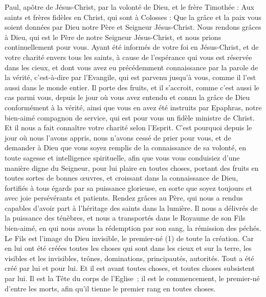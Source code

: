 \BFont
\begin{multicols}{2}
\TextTitle{[Salutation]}
\VerseOne{}Paul, apôtre de Jésus-Christ, par la volonté de Dieu, et le frère Timothée :
Aux saints et frères fidèles en Christ, qui sont à Colosses : Que la grâce et la paix vous soient données par Dieu notre Père et Seigneur Jésus-Christ.
Nous rendons grâces à Dieu, qui est le Père de notre Seigneur Jésus-Christ, et nous prions continuellement pour vous.
Ayant été informés de votre foi en Jésus-Christ, et de votre charité envers tous les saints,
à cause de l'espérance qui vous est réservée dans les cieux, et dont vous avez eu précédemment connaissance par la parole de la vérité, c'est-à-dire par l'Evangile,
qui est parvenu jusqu'à vous, comme il l'est aussi dans le monde entier. Il porte des fruits, et il s’accroit, comme c’est aussi le cas parmi vous, depuis le jour où vous avez entendu et connu la grâce de Dieu conformément à la vérité,
ainsi que vous en avez été instruits par Epaphras, notre bien-aimé compagnon de service, qui est pour vous un fidèle ministre de Christ.
Et il nous a fait connaître votre charité selon l’Esprit.
C'est pourquoi depuis le jour où nous l’avons appris, nous n’avons cessé de prier pour vous, et de demander à Dieu que vous soyez remplis de la connaissance de sa volonté, en toute sagesse et intelligence spirituelle,
afin que vous vous conduisiez d’une manière digne du Seigneur, pour lui plaire en toutes choses, portant des fruits en toutes sortes de bonnes œuvres, et croissant dans la connaissance de Dieu,
fortifiés à tous égards par sa puissance glorieuse, en sorte que soyez toujours et avec joie persévérants et patients.
Rendez grâces au Père, qui nous a rendus capables d’avoir part à l'héritage des saints dans la lumière.
Il nous a délivrés de la puissance des ténèbres, et nous a transportés dans le Royaume de son Fils bien-aimé,
en qui nous avons la rédemption par son sang, la rémission des péchés.
Le Fils est l'image du Dieu invisible, le premier-né (1) de toute la création.
Car en lui ont été créées toutes les choses qui sont dans les cieux et sur la terre, les visibles et les invisibles, trônes, dominations, principautés, autorités. Tout a été créé par lui et pour lui.
Et il est avant toutes choses, et toutes choses subsistent par lui.
Il est la Tête du corps de l'Eglise ; il est le commencement, le premier-né d'entre les morts, afin qu'il tienne le premier rang en toutes choses.

\end{multicols}
